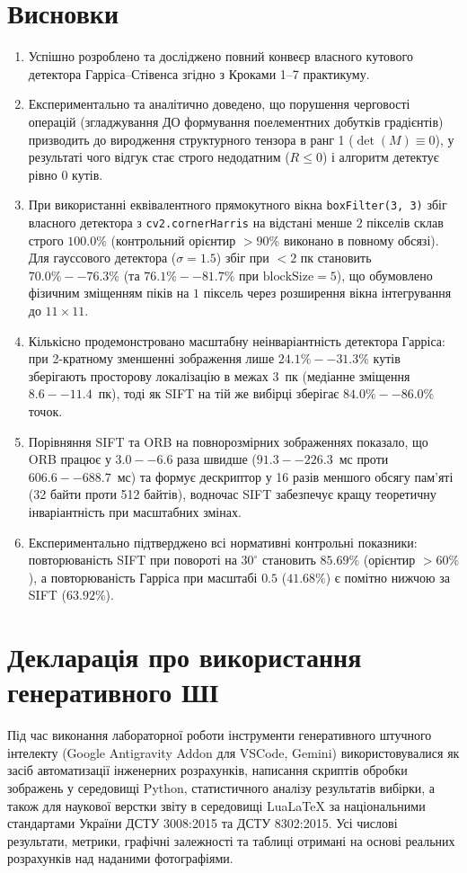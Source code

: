 \documentclass[14pt, a4paper]{extarticle}
\begin{document}
\section{Висновки}
\begin{enumerate}
    \item Успішно розроблено та досліджено повний конвеєр власного кутового детектора Гарріса--Стівенса згідно з Кроками 1--7 практикуму.
    \item Експериментально та аналітично доведено, що порушення черговості операцій (згладжування ДО формування поелементних добутків градієнтів) призводить до виродження структурного тензора в ранг 1 ($\det(M) \equiv 0$), у результаті чого відгук стає строго недодатним ($R \le 0$) і алгоритм детектує рівно $0$ кутів.
    \item При використанні еквівалентного прямокутного вікна \texttt{boxFilter(3, 3)} збіг власного детектора з \texttt{cv2.cornerHarris} на відстані менше $2$ пікселів склав строго $100.0\%$ (контрольний орієнтир $>90\%$ виконано в повному обсязі). Для гауссового детектора ($\sigma = 1.5$) збіг при $< 2$ пк становить $70.0\%--76.3\%$ (та $76.1\%--81.7\%$ при $\text{blockSize}=5$), що обумовлено фізичним зміщенням піків на $1$ піксель через розширення вікна інтегрування до $11 \times 11$.
    \item Кількісно продемонстровано масштабну неінваріантність детектора Гарріса: при 2-кратному зменшенні зображення лише $24.1\%--31.3\%$ кутів зберігають просторову локалізацію в межах $3$~пк (медіанне зміщення $8.6--11.4$~пк), тоді як SIFT на тій же вибірці зберігає $84.0\%--86.0\%$ точок.
    \item Порівняння SIFT та ORB на повнорозмірних зображеннях показало, що ORB працює у $3.0--6.6$ раза швидше ($91.3--226.3$~мс проти $606.6--688.7$~мс) та формує дескриптор у 16 разів меншого обсягу пам'яті (32 байти проти 512 байтів), водночас SIFT забезпечує кращу теоретичну інваріантність при масштабних змінах.
    \item Експериментально підтверджено всі нормативні контрольні показники: повторюваність SIFT при повороті на $30^\circ$ становить $85.69\%$ (орієнтир $>60\%$), а повторюваність Гарріса при масштабі $0.5$ ($41.68\%$) є помітно нижчою за SIFT ($63.92\%$).
\end{enumerate}

\section{Декларація про використання генеративного ШІ}
Під час виконання лабораторної роботи інструменти генеративного штучного інтелекту (Google Antigravity Addon для VSCode, Gemini) використовувалися як засіб автоматизації інженерних розрахунків, написання скриптів обробки зображень у середовищі Python, статистичного аналізу результатів вибірки, а також для наукової верстки звіту в середовищі LuaLaTeX за національними стандартами України ДСТУ 3008:2015 та ДСТУ 8302:2015. Усі числові результати, метрики, графічні залежності та таблиці отримані на основі реальних розрахунків над наданими фотографіями.

\clearpage
\begingroup
\fontsize{11pt}{14pt}\selectfont
\linespread{1.0}\selectfont
\setlength{\bibitemsep}{0.3em}
\printbibliography[
    title={СПИСОК ВИКОРИСТАНИХ ДЖЕРЕЛ},
    heading=bibintoc
]
\endgroup
\end{document}
